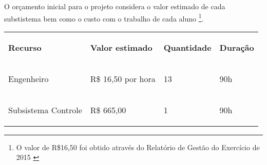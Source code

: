 O orçamento inicial para o projeto considera o valor estimado de cada substistema bem como o custo com o trabalho de cada aluno \footnote{O valor de R\$16,50 foi obtido através do Relatório de Gestão do Exercício de 2015 \cite{unb2015}}. 
\begin{table}[h]
 \centering
 {\renewcommand\arraystretch{1.25}
 \begin{tabular}{ l l l l }
  \cline{1-1}\cline{2-2}\cline{3-3}\cline{4-4}  
    \multicolumn{1}{p{2.367cm}|}{\begin{center}\textbf{Recurso}
\end{center}} &
    \multicolumn{1}{p{2.367cm}|}{\begin{center}\textbf{Valor estimado}
\end{center}} &
    \multicolumn{1}{p{2.367cm}|}{\begin{center}\textbf{Quantidade}
\end{center}} &
    \multicolumn{1}{p{2.367cm}}{\begin{center}\textbf{Duração}
\end{center}}
  \\  
  \cline{1-1}\cline{2-2}\cline{3-3}\cline{4-4}  
    \multicolumn{1}{p{2.367cm}|}{\begin{center}Engenheiro
\end{center}} &
    \multicolumn{1}{p{2.367cm}|}{\begin{center}R\$ 16,50 por hora
\end{center}} &
    \multicolumn{1}{p{2.367cm}|}{\begin{center}13
\end{center}} &
    \multicolumn{1}{p{2.367cm}}{\begin{center}90h
\end{center}}
  \\  
  \cline{1-1}\cline{2-2}\cline{3-3}\cline{4-4}  
    \multicolumn{1}{p{2.367cm}|}{\begin{center}Subsistema Controle
\end{center}} &
    \multicolumn{1}{p{2.367cm}|}{\begin{center}R\$ 665,00
\end{center}} &
    \multicolumn{1}{p{2.367cm}|}{\begin{center}1
\end{center}} &
    \multicolumn{1}{p{2.367cm}}{\begin{center}90h
\end{center}}
  \\  

\end{tabular}}
\end{table}
